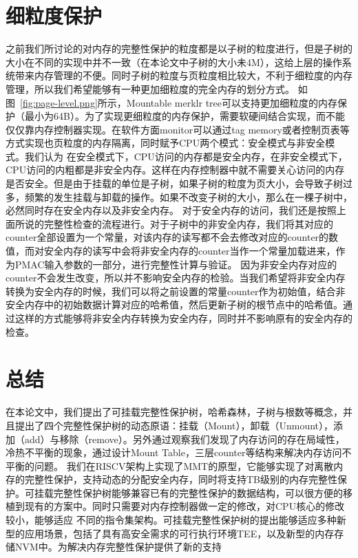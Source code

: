 \section{细粒度保护}
之前我们所讨论的对内存的完整性保护的粒度都是以子树的粒度进行，但是子树的大小在不同的实现中并不一致（在本论文中子树的大小未4M），这给上层的操作系统带来内存管理的不便。同时子树的粒度与页粒度相比较大，不利于细粒度的内存管理，所以我们希望能够有一种更加细粒度的完全内存的划分方式。
如图~\ref{fig:page-level.png}所示，Mountable merklr tree可以支持更加细粒度的内存保护（最小为64B）。为了实现更细粒度的内存保护，需要软硬间结合实现，而不能仅仅靠内存控制器实现。在软件方面monitor可以通过tag memory或者控制页表等方式实现也页粒度的内存隔离，同时赋予CPU两个模式：安全模式与非安全模式。我们认为
在安全模式下，CPU访问的内存都是安全内存，在非安全模式下，CPU访问的内粗都是非安全内存。这样在内存控制器中就不需要关心访问的内存是否安全。但是由于挂载的单位是子树，如果子树的粒度为页大小，会导致子树过多，频繁的发生挂载与卸载的操作。如果不改变子树的大小，那么在一棵子树中，必然同时存在安全内存以及非安全内存。
对于安全内存的访问，我们还是按照上面所说的完整性检查的流程进行。对于子树中的非安全内存，我们将其对应的counter全部设置为一个常量，对该内存的读写都不会去修改对应的counter的数值，而对安全内存的读写中会将非安全内存的counter当作一个常量加载进来，作为PMAC输入参数的一部分，进行完整性计算与验证。
因为非安全内存对应的counter不会发生改变，所以并不影响安全内存的检验。当我们希望将非安全内存转换为安全内存的时候，我们可以将之前设置的常量counter作为初始值，结合非安全内存中的初始数据计算对应的哈希值，然后更新子树的根节点中的哈希值。通过这样的方式能够将非安全内存转换为安全内存，同时并不影响原有的安全内存的检查。

\section{总结}
在本论文中，我们提出了可挂载完整性保护树，哈希森林，子树与根数等概念，并且提出了四个完整性保护树的动态原语：挂载（Mount），卸载（Unmount），添加（add）与移除（remove）。另外通过观察我们发现了内存访问的存在局域性，冷热不平衡的现象，通过设计Mount Table，三层counter等结构来解决内存访问不平衡的问题。
我们在RISCV架构上实现了MMT的原型，它能够实现了对离散内存的完整性保护，支持动态的分配安全内存，同时将支持TB级别的内存完整性保护。可挂载完整性保护树能够兼容已有的完整性保护的数据结构，可以很方便的移植到现有的方案中。同时只需要对内存控制器做一定的修改，对CPU核心的修改较小，能够适应
不同的指令集架构。可挂载完整性保护树的提出能够适应多种新型的应用场景，包括了具有高安全需求的可行执行环境TEE，以及新型的内存存储NVM中。为解决内存完整性保护提供了新的支持




